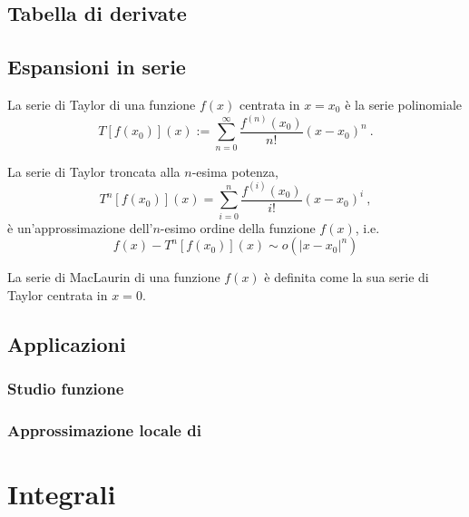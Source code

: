 \section{Tabella di derivate}

\section{Espansioni in serie}
\begin{definition} La serie di Taylor di una funzione $f(x)$ centrata in $x=x_0$ è la serie polinomiale
\begin{equation}
   T[f(x_0)](x) := \sum_{n=0}^{\infty} \dfrac{f^{(n)}(x_0)}{n!} (x-x_0)^n \ .
\end{equation}
\end{definition}
%
\begin{theorem}
La serie di Taylor troncata alla $n$-esima potenza,
\begin{equation}
  T^n[f(x_0)](x) = \sum_{i=0}^{n} \dfrac{f^{(i)}(x_0)}{i!} (x-x_0)^i \ ,
\end{equation}
è un'approssimazione dell'$n$-esimo ordine della funzione $f(x)$, i.e.
\begin{equation}
  f(x) - T^n[f(x_0)](x) \sim o(|x-x_0|^{n})
\end{equation}
\end{theorem}

\begin{definition} La serie di MacLaurin di una funzione $f(x)$ è definita come la sua serie di Taylor centrata in $x=0$.
\end{definition}

\section{Applicazioni}
\subsection{Studio funzione}

\subsection{Approssimazione locale di }

\chapter{Integrali}

